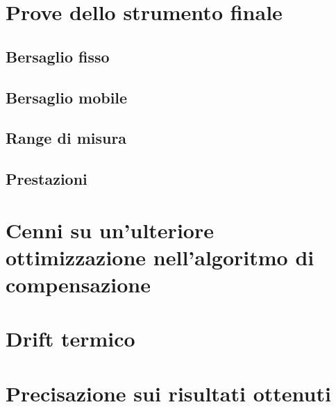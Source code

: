 \section{Prove dello strumento finale}

\subsection{Bersaglio fisso}

\subsection{Bersaglio mobile}

\subsection{Range di misura}

\subsection{Prestazioni}

\section{Cenni su un'ulteriore ottimizzazione nell'algoritmo di compensazione}

\section{Drift termico}

\section{Precisazione sui risultati ottenuti}